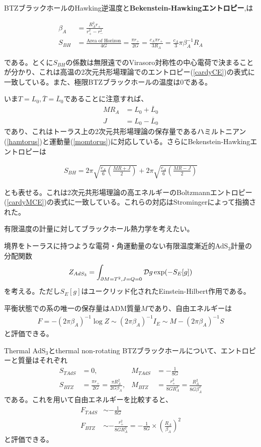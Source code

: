 BTZブラックホールのHawking逆温度と\textbf{Bekenstein-Hawkingエントロピー}\cite{Bekenstein:1973ur},\cite{Hawking:1974sw}は
\begin{oframed}
\begin{align}
\beta_A&=\frac{R_A^2 r_+}{r_+^2-r_-^2}\\
S_{BH}&=\frac{\text{Area of Horizon}}{4G}=\frac{\pi r_+}{2G}=\frac{c_A\pi r_+}{3R_A}=\frac{c_A}{3}\pi \beta_A^{-1} R_A
\end{align}
\end{oframed}
である。とくに$S_{BH}$の係数は無限遠でのVirasoro対称性の中心電荷で決まることが分かり、これは高温の2次元共形場理論でのエントロピー(\ref{cardyCE})の表式に一致している。また、極限BTZブラックホールの温度は$0$である。

いま$T=L_0,\overline{T}=\overline{L}_0$であることに注意すれば、
\begin{align}
MR_A&=L_0+\overline{L}_0\\
J&=L_0-\overline{L}_0
\end{align}
であり、これはトーラス上の2次元共形場理論の保存量であるハミルトニアン(\ref{hamtorus})と運動量(\ref{momtorus})に対応している。さらにBekenstein-Hawkingエントロピーは
\begin{oframed}
\begin{align}
S_{BH}=2\pi \sqrt{\frac{c_A}{6}\left(\frac{MR+J}{2}\right)}+2\pi \sqrt{\frac{c_A}{6}\left(\frac{MR-J}{2}\right)}
\end{align}
\end{oframed}
とも表せる。これは2次元共形場理論の高エネルギーのBoltzmannエントロピー(\ref{cardyMCE})の表式に一致している。これらの対応はStrominger\cite{Strominger:1997eq}によって指摘された。

有限温度の計量に対してブラックホール熱力学を考えたい。

境界をトーラスに持つような電荷・角運動量のない有限温度漸近的AdS$_3$計量の分配関数
\begin{align}
Z_{AdS_3}=\int_{\partial M=T^2,J=Q=0}\mathcal{D}g \exp(-S_E[g])
\end{align}
を考える。ただし$S_E[g]$はユークリッド化されたEinstein-Hilbert作用である。

平衡状態での系の唯一の保存量はADM質量$M$であり、自由エネルギーは
\begin{align}
F=-(2\pi\beta_A)^{-1}\log Z\sim (2\pi\beta_A)^{-1} I_E\sim M-(2\pi\beta_A)^{-1} S
\end{align}
と評価できる。

Thermal AdS$_3$とthermal non-rotating BTZブラックホールについて、エントロピーと質量はそれぞれ
\begin{align}
&&S_{TAdS}&=0,& M_{TAdS}&=-\frac{1}{8G}&&\\
&&S_{BTZ}&=\frac{\pi r_+}{2G}=\frac{\pi R_A^2}{2G\beta_A},& M_{BTZ}&=\frac{r_+^2}{8GR_A^2}=\frac{R_A^2}{8G\beta_A^2}&&
\end{align}
である。これを用いて自由エネルギーを比較すると、
\begin{align}
F_{TAdS}&\sim -\frac{1}{8G}\\
F_{BTZ}&\sim -\frac{r_+^2}{8GR_A^2}=-\frac{1}{8G}\times\left(\frac{R_A}{\beta_A}\right)^2
\end{align}
と評価できる。

